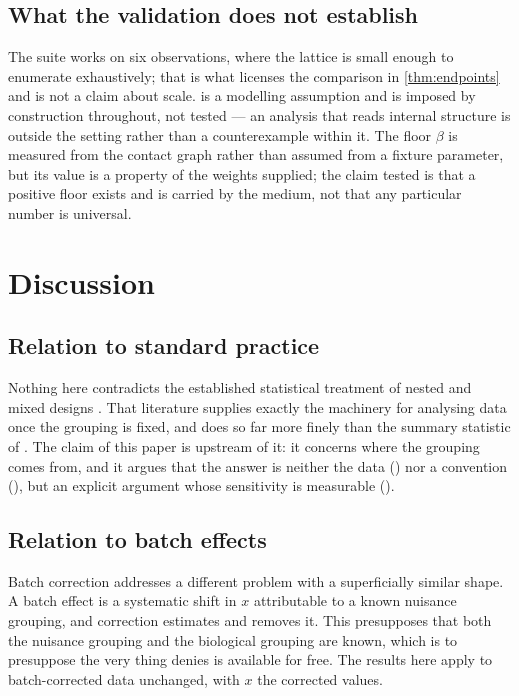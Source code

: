 \documentclass[11pt,a4paper]{article}
\theoremstyle{definition}
\theoremstyle{remark}
\newcommand{\flo}{\beta}
\begin{document}
\subsection{What the validation does not establish}

The suite works on six observations, where the lattice is small enough
to enumerate exhaustively; that is what licenses the comparison in
\cref{thm:endpoints} and is not a claim about scale.
 is a modelling assumption and is imposed by
construction throughout, not tested --- an analysis that reads internal
structure is outside the setting rather than a counterexample within
it. The floor $\flo$ is measured from the contact graph rather than
assumed from a fixture parameter, but its value is a property of the
weights supplied; the claim tested is that a positive floor exists and
is carried by the medium, not that any particular number is universal.

\section{Discussion}
\label{sec:discussion}

\subsection{Relation to standard practice}

Nothing here contradicts the established statistical treatment of nested
and mixed designs \citep{searle1992variance}. That literature supplies
exactly the machinery for analysing data once the grouping is fixed, and
does so far more finely than the summary statistic of .
The claim of this paper is upstream of it: it concerns where the grouping
comes from, and it argues that the answer is neither the data
() nor a convention
(), but an explicit argument whose sensitivity
is measurable ().

\subsection{Relation to batch effects}

Batch correction addresses a different problem with a superficially
similar shape. A batch effect is a systematic shift in $x$ attributable
to a known nuisance grouping, and correction estimates and removes it.
This presupposes that both the nuisance grouping and the biological
grouping are known, which is to presuppose the very thing
 denies is available for free. The results here
apply to batch-corrected data unchanged, with $x$ the corrected values.
\end{document}
